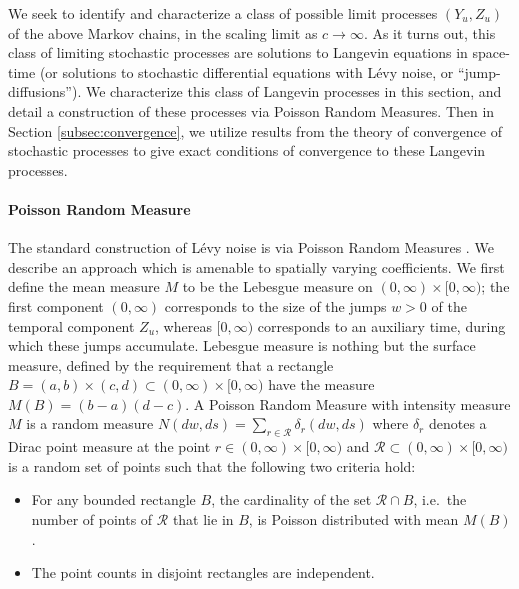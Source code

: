 \documentclass[a4paper,12pt]{elsarticle}
\numberwithin{equation}{section}
\theoremstyle{plain}
\theoremstyle{definition}
\theoremstyle{remark}
\numberwithin{equation}{section}
\newcommand{\1}{\mathbf 1}
\begin{document}
We seek to identify and characterize a class of possible limit processes
$(Y_u, Z_u)$ of the above Markov chains,
in the scaling limit as $c \to \infty$. As it turns out, this class of 
limiting stochastic processes are solutions to
Langevin equations in space-time (or solutions to stochastic differential
equations with L\'evy noise, or ``jump-diffusions'').
We characterize this class of Langevin processes in this section, and detail 
a construction of these processes via Poisson Random Measures.
Then in Section \ref{subsec:convergence}, we utilize results from the theory of
convergence of stochastic processes to give exact conditions of convergence
to these Langevin processes.

\paragraph{Poisson Random Measure}
The standard construction of L\'evy noise is via Poisson Random Measures
\citep{Applebaum}.  We describe an approach which is amenable to spatially 
varying coefficients. 
We first define the mean measure $M$ to be the Lebesgue measure on 
$(0,\infty) \times [0,\infty)$; the first component $(0,\infty)$ corresponds 
to the size of the jumps $w > 0$ of the temporal component $Z_u$, whereas $[0,\infty)$
corresponds to an auxiliary time, during which these jumps accumulate. 
Lebesgue measure is nothing but the surface measure, defined by the requirement 
that a rectangle $B = (a,b) \times (c,d) \subset (0,\infty) \times [0,\infty)$
have the measure $M(B) = (b-a)(d-c)$.  
A Poisson Random Measure with intensity measure $M$ is a random measure 
$N(dw, ds) = \sum_{r \in \mathcal R} \delta_{r}(dw, ds)$ where $\delta_r$ 
denotes a Dirac point measure at the point $r \in (0,\infty) \times [0,\infty)$
and $\mathcal R \subset (0,\infty) \times [0,\infty)$ is a random set of points 
such that the following two criteria hold: 
\begin{itemize}
  \item 
  For any bounded rectangle $B$, the cardinality of the set $\mathcal R \cap B$,
  i.e.\ the number of 
  points of $\mathcal R$ that lie in $B$, is Poisson distributed with mean 
  $M(B)$.
  \item
  The point counts in disjoint rectangles are independent. 
\end{itemize}
\end{document}
